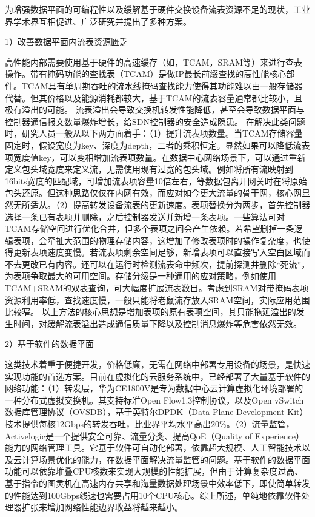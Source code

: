 \label{chap113}

为增强数据平面的可编程性以及缓解基于硬件交换设备流表资源不足的现状，工业界学术界互相促进、广泛研究并提出了多种方案。

1）改善数据平面内流表资源匮乏

高性能内部需要使用基于硬件的高速缓存（如，TCAM，SRAM等）来进行查表操作。带有掩码功能的查找表（TCAM）是做IP最长前缀查找的高性能核心部件。TCAM具有单周期吞吐的流水线掩码查找能力使得其功能难以由一般存储器代替。但其价格以及能源消耗都较大，基于TCAM的流表容量通常都比较小，且极有溢出的可能。
流表溢出会导致交换机转发性能降低，甚至会导致数据平面与控制器通信报文数量爆炸增长，给SDN控制器的安全造成隐患。
在解决此类问题时，研究人员一般从以下两方面着手：（1）提升流表项数量。当TCAM存储容量固定时，假设宽度为key、深度为depth，二者的乘积恒定。显然如果可以降低流表项宽度值key，可以变相增加流表项数量。在数据中心网络场景下，可以通过重新定义包头域宽度来定义流，无需使用现有过宽的包头域。例如将所有流映射到16bits宽度的匹配域，可增加流表项容量10倍左右，等数据包离开网关时在将原始包头还原。但这种思路仅仅在内网有效，而应对如今更大流量的骨干网，核心网显然无所适从。（2）提高转发设备流表的更新速度。表项替换分为两步，首先控制器选择一条已有表项并删除，之后控制器发送并新增一条表项。一些算法可对TCAM存储空间进行优化合并，但多个表项之间会产生依赖。若希望删掉一条逻辑表项，会牵扯大范围的物理存储内容，这增加了修改表项时的操作复杂度，也使得更新表项速度变慢。若流表项剩余空间足够，新增表项可以直接写入空白区域而不去更改已有内容。还可以在运行时检测流表命中频次，提前探测并删除“死流”，为表项争取最大的可用空间。存储分级是一种通用的应对策略，例如使用TCAM+SRAM的双表查询，可大幅度扩展流表数目。考虑到SRAM对带掩码表项资源利用率低，查找速度慢，一般只能将老鼠流存放入SRAM空间，实际应用范围比较窄。
以上方法的核心思想是增加表项的原有表项空间，其只能拖延溢出的发生时间，对缓解流表溢出造成通信质量下降以及控制消息爆炸等危害依然无效。

2）基于软件的数据平面

这类技术着重于便捷开发，价格低廉，无需在网络中部署专用设备的场景，是快速实现功能的首选方案。目前在虚拟化的云服务系统中，已经部署了大量基于软件的网络功能：（1）转发层，华为CE1800V是专为数据中心云计算虚拟化环境部署的一种分布式虚拟交换机。其支持标准Open Flow1.3控制协议，以及Open vSwitch 数据库管理协议（OVSDB），基于英特尔DPDK（Data Plane Development Kit）技术提供每核12Gbps的转发吞吐，比业界平均水平高出20\%。（2）流量监管，Activelogic是一个提供安全可靠、流量分类、提高QoE（Quality of Experience）能力的网络管理工具。它基于软件可自动化部署，依靠超大规模、人工智能技术以及云计算场景优化的能力，在数据平面解决流量监管的问题。基于软件的数据平面功能可以依靠堆叠CPU核数来实现大规模的性能扩展，但由于计算复杂度过高、基于指令的图灵机在高速内存共享和海量数据处理场景中效率低下，即使简单转发的性能达到100Gbps线速也需要占用10个CPU核心。综上所述，单纯地依靠软件处理器扩张来增加网络性能边界收益将越来越小。

